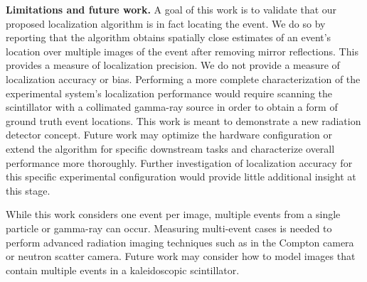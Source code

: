 \noindent
\textbf{Limitations and future work.}
A goal of this work is to validate that our proposed localization algorithm is in 
fact locating the event.
We do so by reporting that the algorithm obtains spatially close estimates of an 
event's location over multiple images of the event after removing mirror reflections.
This provides a measure of localization precision.
We do not provide a measure of localization accuracy or bias.
Performing a more complete characterization of the experimental system's 
localization performance would require scanning the scintillator with a collimated 
gamma-ray source in order to obtain a form of ground truth event locations.
This work is meant to demonstrate a new radiation detector concept.
Future work may optimize the hardware configuration or extend the algorithm for 
specific downstream tasks and characterize overall performance more thoroughly.
Further investigation of localization accuracy for this specific experimental 
configuration would provide little additional insight at this stage.

While this work considers one event per image, multiple events from a single 
particle or gamma-ray can occur. 
Measuring multi-event cases is needed to perform advanced radiation imaging 
techniques such as in the Compton camera or neutron scatter camera.
Future work may consider how to model images that contain multiple events in a 
kaleidoscopic scintillator.


